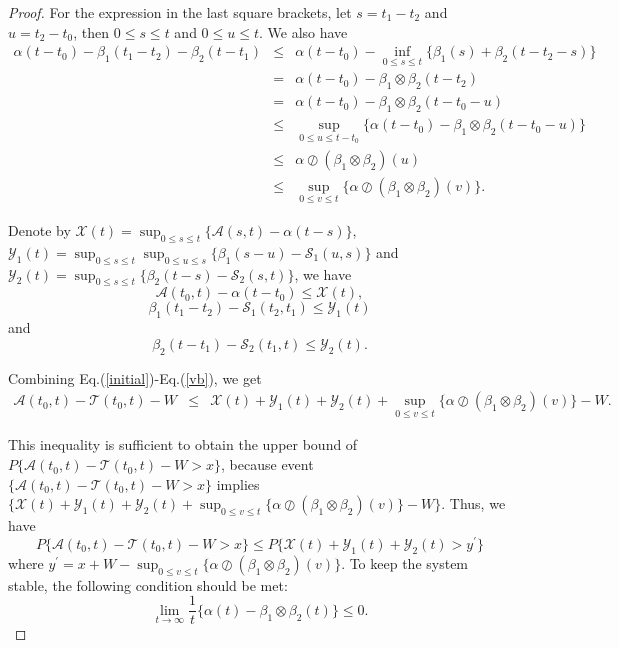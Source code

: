 \documentclass[12pt]{article}
\newtheorem{proof}{Proof}
\begin{document}
\begin{proof}
For the expression in the last square brackets, let $s=t_{1}-t_{2}$ and $u=t_{2}-t_{0}$, then $0\leq s\leq t$ and $0\leq u\leq t$. We also have
\begin{eqnarray}
  \alpha(t-t_{0})-\beta_1(t_{1}-t_{2})-\beta_2(t-t_1)&\leq &\alpha(t-t_{0})-\inf_{0\leq s\leq t}\{\beta_1(s)+\beta_2(t-t_2-s)\}\nonumber\\
  &=&\alpha(t-t_{0})-\beta_1\otimes\beta_2(t-t_{2})\nonumber\\
  &=&\alpha(t-t_{0})-\beta_1\otimes\beta_2(t-t_{0}-u)\nonumber\\
  &\leq & \sup_{0\leq u\leq t-t_0}\{\alpha(t-t_0)-\beta_1\otimes\beta_2(t-t_0-u)\}\nonumber\\
  &\leq& \alpha\oslash(\beta_1\otimes\beta_2)(u)\nonumber\\
  &\leq & \sup_{0\leq v\leq t}\{\alpha\oslash(\beta_1\otimes\beta_2)(v)\}.\label{curve}
\end{eqnarray}

Denote by $\mathcal{X}(t)=\sup_{0\leq s\leq t}\{\mathcal{A}(s,t)-\alpha(t-s)\}$, $\mathcal{Y}_1(t)=\sup_{0\leq s\leq t}\sup_{0\leq u\leq s}\{\beta_1(s-u)-\mathcal{S}_1(u,s)\}$ and $\mathcal{Y}_2(t)=\sup_{0\leq s\leq t}\{\beta_2(t-s)-\mathcal{S}_2(s,t)\}$, we have
\begin{equation}\label{vbc}
\mathcal{A}(t_{0},t)-\alpha(t-t_{0})\leq \mathcal{X}(t),
\end{equation}
\begin{equation}\label{mb}
\beta_1(t_1-t_{2})-\mathcal{S}_1(t_{2},t_1)\leq \mathcal{Y}_1(t)
\end{equation}
and
\begin{equation}\label{vb}
\beta_2(t-t_{1})-\mathcal{S}_2(t_{1},t)\leq \mathcal{Y}_2(t).
\end{equation}

Combining Eq.(\ref{initial})-Eq.(\ref{vb}), we get
\begin{eqnarray*}
\mathcal{A}(t_0,t)-\mathcal{T}(t_0,t)-W &\leq& \mathcal{X}(t)+\mathcal{Y}_1(t)+\mathcal{Y}_2(t)+\sup_{0\leq v\leq t}\{\alpha\oslash(\beta_1\otimes\beta_2)(v)\}-W.
\end{eqnarray*}

This inequality is sufficient to obtain the upper bound of $P\{\mathcal{A}(t_0,t)-\mathcal{T}(t_0,t)-W>x\}$, because event $\{\mathcal{A}(t_0,t)-\mathcal{T}(t_0,t)-W>x\}$ implies $\{\mathcal{X}(t)+\mathcal{Y}_1(t)+\mathcal{Y}_2(t)+\sup_{0\leq v\leq t}\{\alpha\oslash(\beta_1\otimes\beta_2)(v)\}-W\}$. Thus, we have
$$P\{\mathcal{A}(t_0,t)-\mathcal{T}(t_0,t)-W>x\}\leq P\{\mathcal{X}(t)+\mathcal{Y}_1(t)+\mathcal{Y}_2(t)>y^\prime\}$$
where $y^\prime=x+W-\sup_{0\leq v\leq t}\{\alpha\oslash(\beta_1\otimes\beta_2)(v)\}$. To keep the system stable, the following condition should be met:
$$\lim_{t\to \infty}\frac{1}{t}\{\alpha(t)-\beta_1\otimes\beta_2(t)\}\leq 0.$$


\end{proof}
\end{document}
